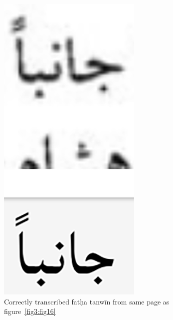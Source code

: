  \begin{figure}[!ht]
	\centering
	\includegraphics[width=\linewidth]{images/image1.png}
	\caption{Correctly transcribed fatḥa tanwīn from same page as figure~\ref{fig3:fig16}}
  	\label{fig3:fig17}
\end{figure}

